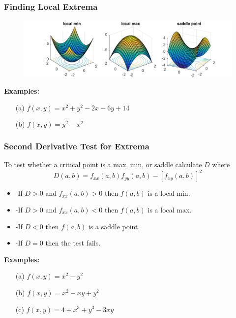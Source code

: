 \documentclass{beamer}
\begin{document}
\begin{frame}
\frametitle{Finding Local Extrema}
\begin{figure}
	\centering
	\includegraphics[width=.9\textwidth]{minmaxsaddle.png}\\
	\hspace*{10pt}\hbox{}
\end{figure}

\vspace{6pt}
\textbf{Examples:}
\begin{itemize}
	\item[(a)] $f(x,y) = x^2+y^2 -2x -6y + 14$
	\item[(b)] $f(x,y) = y^2-x^2$
\end{itemize}
\end{frame}

\begin{frame}
\frametitle{Second Derivative Test for Extrema}
To test whether a critical point is a max, min, or saddle calculate $D$ where
$$D(a,b) = f_{xx}(a,b)f_{yy}(a,b) - [f_{xy}(a,b)]^2$$
\begin{itemize}
	\item -If $D>0$ and $f_{xx}(a,b) > 0$ then $f(a,b)$ is a local min.
	\item -If $D>0$ and $f_{xx}(a,b) < 0$ then $f(a,b)$ is a local max.
	\item -If $D<0$ then $f(a,b)$ is a saddle point.
	\item -If $D=0$ then the test fails.
\end{itemize}

\vspace{6pt}
\textbf{Examples:}
\begin{itemize}
	\item[(a)] $f(x,y) = x^2-y^2$
	\item[(b)] $f(x,y) = x^2-xy + y^2$
	\item[(c)] $f(x,y) = 4+x^3+y^3-3xy$
\end{itemize}
\end{frame}
\end{document}
